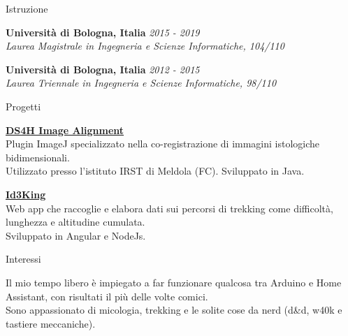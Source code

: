 \documentclass{../resume} %
\begin{document}
\begin{rSection}{Istruzione}

{\bf Università di Bologna, Italia } \hfill {\em 2015 - 2019} 
\\{ \textit {Laurea Magistrale in Ingegneria e Scienze Informatiche, 104/110 }} 

{\bf Università di Bologna, Italia } \hfill {\em 2012 - 2015} 
\\ { \textit {Laurea Triennale in Ingegneria e Scienze Informatiche, 98/110 }} \hfill


\end{rSection}


\begin{rSection}{Progetti}

{\bf \href{https://imagej.net/plugins/ds4h-image-alignment}{DS4H Image Alignment}}
\\ Plugin ImageJ specializzato nella co-registrazione di immagini istologiche bidimensionali.\\
Utilizzato presso l'istituto IRST di Meldola (FC). Sviluppato in Java.

{\bf \href{https://github.com/illeb/id3king}{Id3King}}
\\ Web app che raccoglie e elabora dati sui percorsi di trekking come difficoltà, lunghezza e altitudine cumulata.\\
Sviluppato in Angular e NodeJs.

\end{rSection}


\begin{rSection}{Interessi}

  Il mio tempo libero è impiegato a far funzionare qualcosa tra Arduino e Home Assistant, con risultati il più delle volte comici.\\ Sono appassionato di micologia, trekking e le solite cose da nerd (d\&d, w40k e tastiere meccaniche).
\end{rSection}
\end{document}
